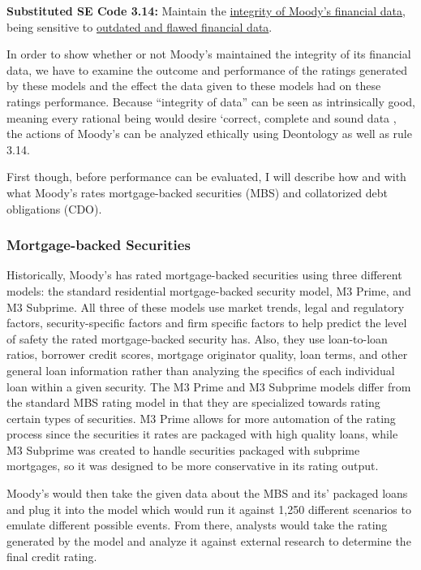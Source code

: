 \documentclass[11pt]{article}
\begin{document}
\begin{multicols}{2}
\begin{framed}
\noindent
   \textbf{Substituted SE Code 3.14: } 
   \newline
   Maintain the \underline{integrity of Moody's financial data}, being sensitive to \underline{outdated and flawed financial data}.
\end{framed}

In order to show whether or not Moody's maintained the integrity of its financial data, we have to examine the outcome and performance of the ratings generated by these models and the effect the data given to these models had on these ratings performance.  Because ``integrity of data''\cite{SEcode} can be seen as intrinsically good, meaning every rational being would desire `correct, complete and sound data \cite{dataIntegrityDef}, the actions of Moody's can be analyzed ethically using Deontology as well as rule 3.14.  \cite{kant}

First though, before performance can be evaluated, I will describe how and with what Moody's rates mortgage-backed securities (MBS) and collatorized debt obligations (CDO).

\subsubsection{Mortgage-backed Securities}

Historically, Moody's has rated mortgage-backed securities using three different models: the standard residential mortgage-backed security model, M3 Prime, and M3 Subprime. \cite[p.120]{govtReport}  All three of these models use market trends, legal and regulatory factors, security-specific factors and firm specific factors to help predict the level of safety the rated mortgage-backed security has.  Also, they use loan-to-loan ratios, borrower credit scores, mortgage originator quality, loan terms, and other general loan information rather than analyzing the specifics of each individual loan within a given security. \cite[p.120]{govtReport}  The M3 Prime and M3 Subprime models differ from the standard MBS rating model in that they are specialized towards rating certain types of securities.  M3 Prime allows for more automation of the rating process since the securities it rates are packaged with high quality loans, while M3 Subprime was created to handle securities packaged with subprime mortgages, so it was designed to be more conservative in its rating output. \cite[p.120-121]{govtReport}  

Moody's would then take the given data about the MBS and its' packaged loans and plug it into the model which would run it against 1,250 different scenarios to emulate different possible events.  From there, analysts would take the rating generated by the model and analyze it against external research to determine the final credit rating. \cite[p.121]{govtReport}


\end{multicols}
\end{document}
